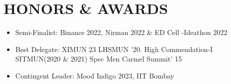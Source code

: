 \documentclass[letterpaper,11pt]{article}
\newcommand{\resumeItem}[1]{
  \item\small{
    {#1 \vspace{-2pt}}
  }
}
\newcommand{\resumeSubItem}[1]{\resumeItem{#1}\vspace{-4pt}}
\newcommand{\resumeSubHeadingListStart}{\begin{itemize}[leftmargin=0.15in, label={}]}
\newcommand{\resumeSubHeadingListEnd}{\end{itemize}}
\begin{document}
%


\section{HONORS \& AWARDS}
  \resumeSubHeadingListStart
    \resumeSubItem
      {Semi-Finalist: Binance 2022, Nirman 2022 \& ED Cell -Ideathon 2022 }
    \resumeSubItem
      {Best Delegate: XIMUN 23 LHSMUN '20. High Commendation-I SITMUN(2020 \& 2021) Spec Men Carmel Summit' 15 }
    \resumeSubItem
      {Contingent Leader: Mood Indigo 2023, IIT Bombay}
  \resumeSubHeadingListEnd

\end{document}
